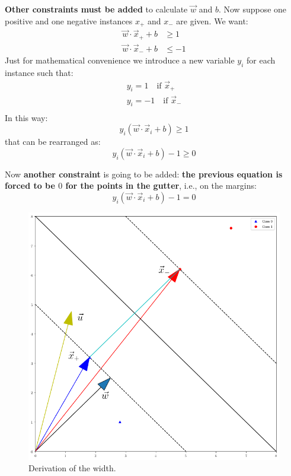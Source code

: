 \documentclass[12pt, letterpaper]{article}
\theoremstyle{definition}
\let\tb\textbf
\begin{document}
\tb{Other constraints must be added} to calculate $\vec{w}$ and $b$. Now suppose one positive and one negative instances $x_+$ and $x_-$ are given. We want:
\begin{equation}
\begin{aligned}
\vec{w} \cdot \vec{x}_+ + b &\ge 1\\
\vec{w} \cdot \vec{x}_- + b &\le -1
\end{aligned}
\end{equation}
Just for mathematical convenience we introduce a new variable $y_i$ for each instance such that:
\begin{equation}
\begin{aligned}
y_i = 1 \quad \text{if } \vec{x}_+\\
y_i = -1 \quad \text{if } \vec{x}_-\\ 
\end{aligned}
\end{equation}
In this way:
\begin{equation}
y_i (\vec{w}\cdot \vec{x}_i + b) \ge 1
\end{equation}
that can be rearranged as:
\begin{equation}
y_i (\vec{w}\cdot \vec{x}_i + b) -1 \ge 0
\end{equation}

Now \tb{another constraint} is going to be added: \tb{the previous equation is forced to be $0$ for the points in the gutter}, i.e., on the margins:
\begin{equation}
y_i (\vec{w}\cdot \vec{x}_i + b) -1 = 0
\label{SVMmargin}
\end{equation}

\begin{figure}
\centering
\includegraphics[scale=0.4]{img/SVMwidth}
\caption{Derivation of the width.}
\label{SVMwidth}
\end{figure}
\end{document}
